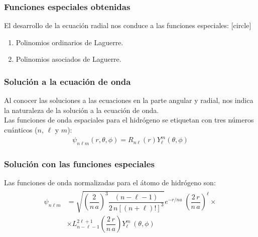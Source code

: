 \documentclass[12pt]{beamer}
\begin{document}
\begin{frame}
\frametitle{Funciones especiales obtenidas}
El desarrollo de la ecuación radial nos conduce a las funciones especiales:
[circle]
\begin{enumerate}[<+->]
\item Polinomios ordinarios de Laguerre.
\item Polinomios asociados de Laguerre.
\end{enumerate}
\end{frame}
\begin{frame}
\frametitle{Solución a la ecuación de onda}
Al conocer las soluciones a las ecuaciones en la parte angular y radial, nos indica la naturaleza de la solución a la ecuación de onda.
\\
\bigskip
\pause
Las funciones de onda espaciales para el hidrógeno se etiquetan con tres números cuánticos ($n$, $\ell$ y $m$):
\begin{align}
\psi_{n \ell m} (r, \theta, \phi) =  R_{n \ell} (r) Y_{\ell}^{m} (\theta, \phi)
\label{eq:ecuacion_04_74}
\end{align}
\end{frame}
\begin{frame}
\frametitle{Solución con las funciones especiales}
Las funciones de onda normalizadas para el átomo de hidrógeno son:
\begin{align}
\begin{aligned}
\psi_{n \ell m} &= \sqrt{\left(\dfrac{2}{n \, a} \right)^{3} \dfrac{(n - \ell - 1)}{2 \, n[(n + \ell)!]^{3}}} e^{-r/na} \; \left( \dfrac{2 \, r}{n \, a} \right)^{\ell} \times \\[1em]
&\times L_{n - \ell -1}^{2 \ell + 1} \left( \dfrac{2 \, r}{n \, a} \right) Y_{\ell}^{m} \, (\theta, \phi)
\end{aligned}
\label{eq:ecuacion_04_89}
\end{align}
\end{frame}
\end{document}
